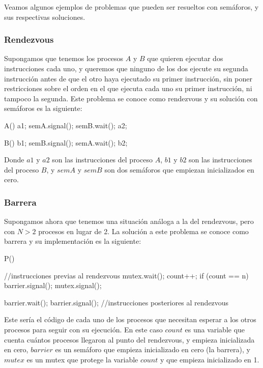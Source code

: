 \documentclass{article}
\begin{document}
Veamos algunos ejemplos de problemas que pueden ser resueltos con sem\'aforos, y sus respectivas soluciones.

\subsubsection{Rendezvous}

Supongamos que tenemos los procesos $A$ y $B$ que quieren ejecutar dos instrucciones cada uno, y queremos que ninguno de los dos ejecute su segunda instrucci\'on antes de que el otro haya ejecutado su primer instrucci\'on, sin poner restricciones sobre el orden en el que ejecuta cada uno su primer instrucci\'on, ni tampoco la segunda. Este problema se conoce como rendezvous y su soluci\'on con sem\'aforos es la siguiente:

\begin{code}
A()
{
    a1;
		semA.signal();
		semB.wait();
		a2;
}

B()
{
    b1;
		semB.signal();
		semA.wait();
		b2;
}
\end{code}

Donde $a1$ y $a2$ son las instrucciones del proceso $A$, $b1$ y $b2$ son las instrucciones del proceso $B$, y $semA$ y $semB$ son dos sem\'aforos que empiezan inicializados en cero.

\subsubsection{Barrera}

Supongamos ahora que tenemos una situaci\'on an\'aloga a la del rendezvous, pero con $N > 2$ procesos en lugar de 2. La soluci\'on a este problema se conoce como barrera y su implementaci\'on es la siguiente:

\begin{code}
P()
{
    //instrucciones previas al rendezvous
    mutex.wait();
    count++;
    if (count == n)
        barrier.signal();
    mutex.signal();
    
    barrier.wait();
    barrier.signal();
    //instrucciones posteriores al rendezvous
}
\end{code}

Este ser\'ia el c\'odigo de cada uno de los procesos que necesitan esperar a los otros procesos para seguir con su ejecuci\'on. En este caso $count$ es una variable que cuenta cu\'antos procesos llegaron al punto del rendezvous, y empieza inicializada en cero, $barrier$ es un sem\'aforo que empieza inicializado en cero (la barrera), y $mutex$ es un mutex que protege la variable $count$ y que empieza inicializado en 1.
\end{document}
